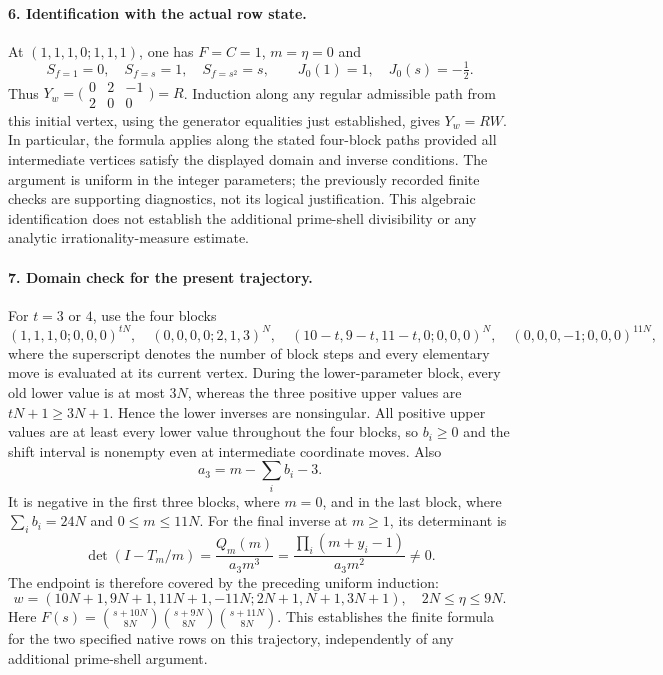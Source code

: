 \documentclass[11pt]{article}
\begin{document}
\paragraph{6. Identification with the actual row state.}
At $(1,1,1,0;1,1,1)$, one has $F=C=1$, $m=\eta=0$ and
\[
 S_{f=1}=0,\quad S_{f=s}=1,\quad S_{f=s^2}=s,\qquad
 J_0(1)=1,\quad J_0(s)=-\tfrac12.
\]
Thus $Y_w=\bigl(\begin{smallmatrix}0&2&-1\\2&0&0\end{smallmatrix}\bigr)=R$.
Induction along any regular admissible path from this initial vertex,
using the generator equalities just established, gives $Y_w=RW$.
In particular, the formula applies along the stated four-block paths
provided all intermediate vertices satisfy the displayed domain and
inverse conditions.  The argument is uniform in the integer parameters;
the previously recorded finite checks are supporting diagnostics, not
its logical justification.  This algebraic identification does not
establish the additional prime-shell divisibility or any analytic
irrationality-measure estimate.


\paragraph{7. Domain check for the present trajectory.}
For $t=3$ or $4$, use the four blocks
\[
 (1,1,1,0;0,0,0)^{tN},\quad
 (0,0,0,0;2,1,3)^N,\quad
 (10-t,9-t,11-t,0;0,0,0)^N,\quad
 (0,0,0,-1;0,0,0)^{11N},
\]
where the superscript denotes the number of block steps and every elementary
move is evaluated at its current vertex.  During the lower-parameter block,
every old lower value is at most $3N$, whereas the three positive upper
values are $tN+1\ge3N+1$.  Hence the lower inverses are nonsingular.
All positive upper values are at least every lower value throughout the
four blocks, so $b_i\ge0$ and the shift interval is nonempty even at
intermediate coordinate moves.  Also
\[
 a_3=m-\sum_i b_i-3.
\]
It is negative in the first three blocks, where $m=0$, and in the last
block, where $\sum_i b_i=24N$ and $0\le m\le11N$.
For the final inverse at $m\ge1$, its determinant is
\[
 \det(I-T_m/m)=\frac{Q_m(m)}{a_3m^3}
 =\frac{\prod_i(m+y_i-1)}{a_3m^2}\ne0.
\]
The endpoint is therefore covered by the preceding uniform induction:
\[
 w=(10N+1,9N+1,11N+1,-11N;2N+1,N+1,3N+1),
 \quad 2N\le\eta\le9N.
\]
Here $F(s)=\binom{s+10N}{8N}\binom{s+9N}{8N}
\binom{s+11N}{8N}$.  This establishes the finite formula for the two
specified native rows on this trajectory, independently of any additional
prime-shell argument.
\end{document}
